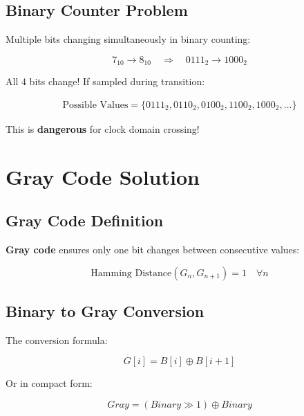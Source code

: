\documentclass[12pt,a4paper]{article}
\begin{document}
\subsection{Binary Counter Problem}

Multiple bits changing simultaneously in binary counting:

\begin{equation}
7_{10} \rightarrow 8_{10} \quad \Rightarrow \quad 0111_2 \rightarrow 1000_2
\end{equation}

All 4 bits change! If sampled during transition:

\begin{align}
\text{Possible Values} = \{0111_2, 0110_2, 0100_2, 1100_2, 1000_2, \ldots\}
\end{align}

This is \textbf{dangerous} for clock domain crossing!

\section{Gray Code Solution}

\subsection{Gray Code Definition}

\textbf{Gray code} ensures only one bit changes between consecutive values:

\begin{equation}
\text{Hamming Distance}(G_n, G_{n+1}) = 1 \quad \forall n
\end{equation}

\subsection{Binary to Gray Conversion}

The conversion formula:

\begin{equation}
\boxed{G[i] = B[i] \oplus B[i+1]}
\end{equation}

Or in compact form:

\begin{equation}
\boxed{Gray = (Binary \gg 1) \oplus Binary}
\end{equation}
\end{document}
